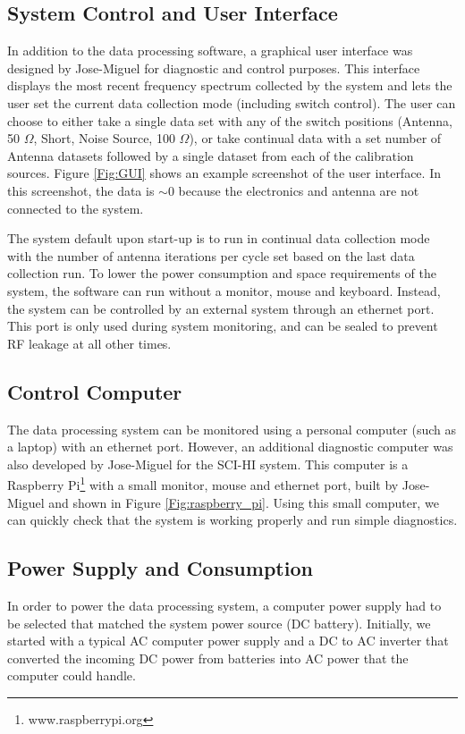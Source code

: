 \subsection{System Control and User Interface}

In addition to the data processing software, a graphical user interface was designed by Jose-Miguel for diagnostic and control purposes. This interface displays the most recent frequency spectrum collected by the system and lets the user set the current data collection mode (including switch control). The user can choose to either take a single data set with any of the switch positions (Antenna, 50 $\Omega$, Short, Noise Source, 100 $\Omega$), or take continual data with a set number of Antenna datasets followed by a single dataset from each of the calibration sources. Figure \ref{Fig:GUI} shows an example screenshot of the user interface. In this screenshot, the data is $\sim0$ because the electronics and antenna are not connected to the system. 

The system default upon start-up is to run in continual data collection mode with the number of antenna iterations per cycle set based on the last data collection run. To lower the power consumption and space requirements of the system, the software can run without a monitor, mouse and keyboard. Instead, the system can be controlled by an external system through an ethernet port. This port is only used during system monitoring, and can be sealed to prevent RF leakage at all other times. 


\subsection{Control Computer}

The data processing system can be monitored using a personal computer (such as a laptop) with an ethernet port. However, an additional diagnostic computer was also developed by Jose-Miguel for the SCI-HI system. This computer is a Raspberry Pi\footnote{www.raspberrypi.org} with a small monitor, mouse and ethernet port, built by Jose-Miguel and shown in Figure \ref{Fig:raspberry_pi}. Using this small computer, we can quickly check that the system is working properly and run simple diagnostics.

\subsection{Power Supply and Consumption}
In order to power the data processing system, a computer power supply had to be selected that matched the system power source (DC battery). Initially, we started with a typical AC computer power supply and a DC to AC inverter that converted the incoming DC power from batteries into AC power that the computer could handle. 

